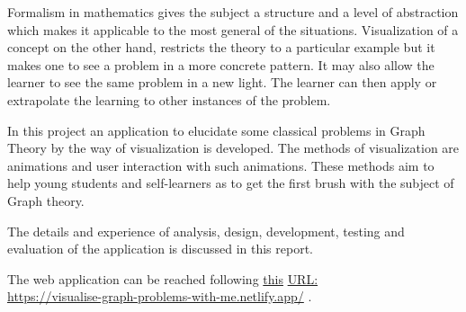 Formalism in mathematics gives the subject a structure and a level of
abstraction which makes it applicable to the most general of the situations.
Visualization of a concept on the other hand, restricts the theory to a
particular example but it makes one to see a problem in a more concrete
pattern. It may also allow the learner to see the same problem in a new light. The
learner can then apply or extrapolate the learning to other instances of the problem. 

In this project an application to elucidate some classical problems in Graph
Theory by the way of visualization is developed. The methods of visualization
are animations and user interaction with such animations. These methods aim to help young students and self-learners as to get the first brush with the subject of Graph theory.

The details and experience of analysis, design, development, testing and
evaluation of the application is discussed in this report.

The web application can be reached following
\href{https://visualise-graph-problems-with-me.netlify.app/} {this} 
\href{https://visualise-graph-problems-with-me.netlify.app/} {URL:} \\
\href{https://visualise-graph-problems-with-me.netlify.app/} {https://visualise-graph-problems-with-me.netlify.app/}
.

